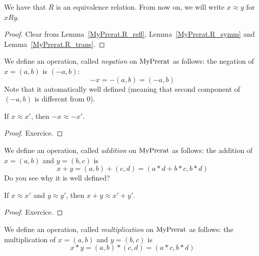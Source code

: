 \begin{lemma}
    \label{MyPrerat.R_equiv}
    \leanok
We have that $R$ is an equivalence relation. From now on, we will write $x \approx y$ for
$x R y$.
\end{lemma}
\begin{proof}
    \leanok
Clear from Lemma~\ref{MyPrerat.R_refl}, Lemma~\ref{MyPrerat.R_symm} and Lemma~\ref{MyPrerat.R_trans}.
\end{proof}

\begin{definition}
    \label{MyPrerat.neg}
    \leanok
We define an operation, called \emph{negation} on $\mathrm{MyPrerat}$ as follows: the negation of $x = (a,b)$ is
$(-a,b)$:
\[
-x = -(a,b) = (-a,b)
\]
Note that it automatically well defined (meaning that second component of $(-a,b)$ is different from $0$).
\end{definition}

\begin{lemma}
    \label{MyPrerat.neg_quotient}
    \leanok
If $x \approx x'$, then $-x \approx -x'$.
\end{lemma}
\begin{proof}
\leanok
Exercice.
\end{proof}

\begin{definition}
    \label{MyPrerat.add}
    \leanok
We define an operation, called \emph{addition} on $\mathrm{MyPrerat}$ as follows: the addition of $x = (a,b)$
and $y = (b, c)$ is
\[
x + y = (a,b) + (c,d) = (a * d + b * c, b*d)
\]
Do you see why it is well defined?
\end{definition}

\begin{lemma}
    \label{MyPrerat.add_quotient}
    \leanok
If $x \approx x'$ and $y \approx y'$, then $x + y \approx x' + y'$.
\end{lemma}
\begin{proof}
\leanok
Exercice.
\end{proof}

\begin{definition}
    \label{MyPrerat.mul}
    \leanok
We define an operation, called \emph{multiplication} on $\mathrm{MyPrerat}$ as follows: the multiplication of $x = (a,b)$ and $y = (b, c)$ is
\[
x * y = (a,b) * (c,d) = (a*c, b*d)
\]
\end{definition}

